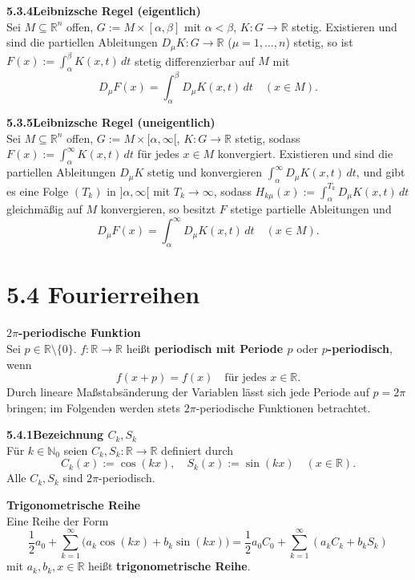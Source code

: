 \documentclass[a4paper,12pt]{article}
\newcommand{\gentry}[3]{%
  \noindent\textbf{#1\quad #2}\nopagebreak\\[0.2em]
  #3\par\smallskip
}
\begin{document}
\gentry{5.3.4}{Leibnizsche Regel (eigentlich)}{%
  Sei $M \subseteq \mathbb{R}^n$ offen, $G := M \times [\alpha, \beta]$ mit $\alpha < \beta$,
  $K: G \to \mathbb{R}$ stetig. Existieren und sind die partiellen Ableitungen
  $D_\mu K: G \to \mathbb{R}$ ($\mu = 1, \ldots, n$) stetig, so ist
  $F(x) := \int_\alpha^\beta K(x,t)\,dt$ stetig differenzierbar auf $M$ mit
  \[
    D_\mu F(x) = \int_\alpha^\beta D_\mu K(x,t)\,dt \quad (x \in M).
  \]
}

\gentry{5.3.5}{Leibnizsche Regel (uneigentlich)}{%
  Sei $M \subseteq \mathbb{R}^n$ offen, $G := M \times [\alpha, \infty[$,
  $K: G \to \mathbb{R}$ stetig, sodass $F(x) := \int_\alpha^\infty K(x,t)\,dt$ für
  jedes $x \in M$ konvergiert. Existieren und sind die partiellen Ableitungen
  $D_\mu K$ stetig und konvergieren $\int_\alpha^\infty D_\mu K(x,t)\,dt$, und gibt
  es eine Folge $(T_k)$ in $]\alpha, \infty[$ mit $T_k \to \infty$, sodass
  $H_{k\mu}(x) := \int_\alpha^{T_k} D_\mu K(x,t)\,dt$ gleichmäßig auf $M$ konvergieren,
  so besitzt $F$ stetige partielle Ableitungen und
  \[
    D_\mu F(x) = \int_\alpha^\infty D_\mu K(x,t)\,dt \quad (x \in M).
  \]
}

\section*{5.4 \quad Fourierreihen}

\gentry{}{$2\pi$-periodische Funktion}{%
  Sei $p \in \mathbb{R}\setminus\{0\}$. $f: \mathbb{R} \to \mathbb{R}$ heißt
  \textbf{periodisch mit Periode $p$} oder \textbf{$p$-periodisch}, wenn
  \[
    f(x+p) = f(x) \quad \text{für jedes } x \in \mathbb{R}.
  \]
  Durch lineare Maßstabsänderung der Variablen lässt sich jede Periode auf
  $p = 2\pi$ bringen; im Folgenden werden stets $2\pi$-periodische Funktionen
  betrachtet.
}

\gentry{5.4.1}{Bezeichnung $C_k, S_k$}{%
  Für $k \in \mathbb{N}_0$ seien $C_k, S_k: \mathbb{R} \to \mathbb{R}$ definiert durch
  \[
    C_k(x) := \cos(kx), \quad S_k(x) := \sin(kx) \quad (x \in \mathbb{R}).
  \]
  Alle $C_k, S_k$ sind $2\pi$-periodisch.
}

\gentry{}{Trigonometrische Reihe}{%
  Eine Reihe der Form
  \[
    \frac{1}{2} a_0 + \sum_{k=1}^\infty \bigl(a_k \cos(kx) + b_k \sin(kx)\bigr)
    = \frac{1}{2} a_0 C_0 + \sum_{k=1}^\infty (a_k C_k + b_k S_k)
  \]
  mit $a_k, b_k, x \in \mathbb{R}$ heißt \textbf{trigonometrische Reihe}.
}
\end{document}
